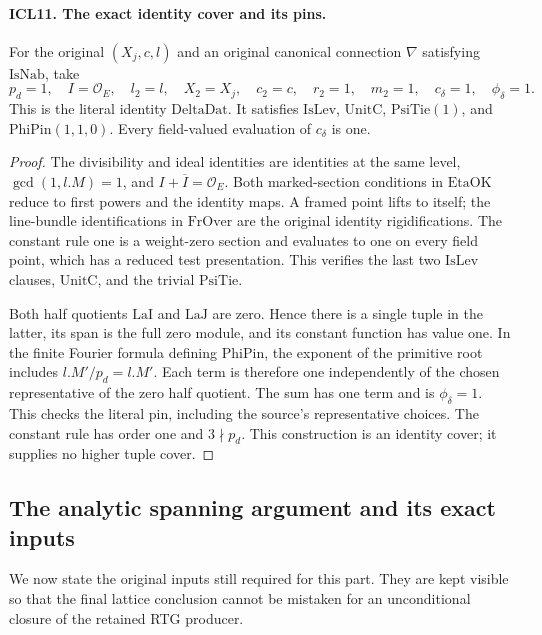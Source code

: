 \documentclass[11pt,a4paper]{article}
\numberwithin{equation}{section}
\theoremstyle{remark}\newtheorem{remark}[theorem]{Remark}
\begin{document}
\paragraph{ICL11. The exact identity cover and its pins.}
\label{claim:ICL11}
For the original \((X_j,c,l)\) and an original canonical
connection \(\nabla\) satisfying \(\mathrm{IsNab}\), take
\[
 p_d=1,\quad I=\mathcal O_E,\quad l_2=l,\quad X_2=X_j,
 \quad c_2=c,\quad r_2=1,\quad m_2=1,
 \quad c_\delta=1,\quad\phi_\delta=1.                 \tag{ICL.5}
\]
This is the literal identity \(\mathrm{DeltaDat}\).  It
satisfies \(\mathrm{IsLev}\), \(\mathrm{UnitC}\),
\(\mathrm{PsiTie}(1)\), and \(\mathrm{PhiPin}(1,1,0)\).
Every field-valued evaluation of \(c_\delta\) is one.
\begin{proof}
The divisibility and ideal identities are identities at
the same level, \(\gcd(1,l.M)=1\), and
\(I+\overline I=\mathcal O_E\).  Both marked-section
conditions in \(\mathrm{EtaOK}\) reduce to first powers
and the identity maps.  A framed point lifts to itself;
the line-bundle identifications in \(\mathrm{FrOver}\) are
the original identity rigidifications.  The constant rule
one is a weight-zero section and evaluates to one on every
field point, which has a reduced test presentation.
This verifies the last two \(\mathrm{IsLev}\) clauses,
\(\mathrm{UnitC}\), and the trivial \(\mathrm{PsiTie}\).

Both half quotients \(\mathrm{LaI}\) and
\(\mathrm{LaJ}\) are zero.  Hence there is a single tuple
in the latter, its span is the full zero module, and its
constant function has value one.  In the finite Fourier
formula defining \(\mathrm{PhiPin}\), the exponent of the
primitive root includes \(l.M'/p_d=l.M'\).  Each term is
therefore one independently of the chosen representative
of the zero half quotient.  The sum has one term and is
\(\phi_\delta=1\).  This checks the literal pin, including
the source's representative choices.  The constant rule
has order one and \(3\nmid p_d\).  This construction is
an identity cover; it supplies no higher tuple cover.
\end{proof}

\subsection{The analytic spanning argument and its exact inputs}

We now state the original inputs still required for this
part.  They are kept visible so that the final lattice
conclusion cannot be mistaken for an unconditional closure
of the retained RTG producer.
\end{document}
